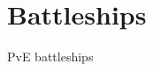 \chapter{Battleships }
\hypertarget{md__r_e_a_d_m_e}{}\label{md__r_e_a_d_m_e}
\label{md__r_e_a_d_m_e_autotoc_md0}%
%


PvE battleships 